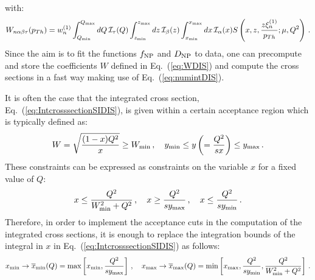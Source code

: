 \documentclass[10pt,a4paper]{article}
\begin{document}
with:
\begin{equation}\label{eq:WDIS}
  W_{n\alpha\beta\tau}(p_{Th}) = 
  w_n^{(1)} \int_{Q_{\rm min}}^{Q_{\rm
      max}}dQ\,\mathcal{I}_\tau(Q) \int_{z_{\rm min}}^{z_{\rm max}}dz\,
  \mathcal{I}_\beta(z) \int_{x_{\rm min}}^{x_{\rm
      max}}dx\, \mathcal{I}_\alpha(x) S\left(x,z,\frac{z\xi_n^{(1)}}{p_{Th}};\mu,Q^2\right)\,.
\end{equation}
Since the aim is to fit the functions $f_{\rm NP}$ and $D_{\rm NP}$ to
data, one can precompute and store the coefficients $W$ defined in
Eq.~(\ref{eq:WDIS}) and compute the cross sections in a fast way
making use of Eq.~(\ref{eq:numintDIS}).

It is often the case that the integrated cross section,
Eq.~(\ref{eq:IntcrosssectionSIDIS}), is given within a certain
acceptance region which is typically defined as:
\begin{equation}
W=\sqrt{\frac{(1-x)Q^2}{x}}\geq W_{\rm min}\,,\quad y_{\rm min}\leq y
\left(=\frac{Q^2}{sx}\right) \leq y_{\rm max}\,.
\end{equation}
These constraints can be expressed as constraints on the variable $x$
for a fixed value of $Q$:
\begin{equation}
  x\leq \frac{Q^2}{W_{\rm min}^2+Q^2}\,,\quad x\geq\frac{Q^2}{s y_{\rm
      max}}\,,\quad x\leq 
  \frac{Q^2}{sy_{\rm min}}\,.
\end{equation}
Therefore, in order to implement the acceptance cuts in the
computation of the integrated cross sections, it is enough to replace
the integration bounds of the integral in $x$ in
Eq.~(\ref{eq:IntcrosssectionSIDIS}) as follows:
\begin{equation}
  x_{\rm min}\rightarrow \overline{x}_{\rm min}(Q)=\mbox{max}\left[x_{\rm min},\frac{Q^2}{s y_{\rm
        max}}\right]\,,\quad   x_{\rm max}\rightarrow \overline{x}_{\rm max}(Q)=\mbox{min}\left[x_{\rm max},\frac{Q^2}{s y_{\rm
        min}}, \frac{Q^2}{W_{\rm min}^2+Q^2}\right]\,.
\end{equation}
\end{document}
